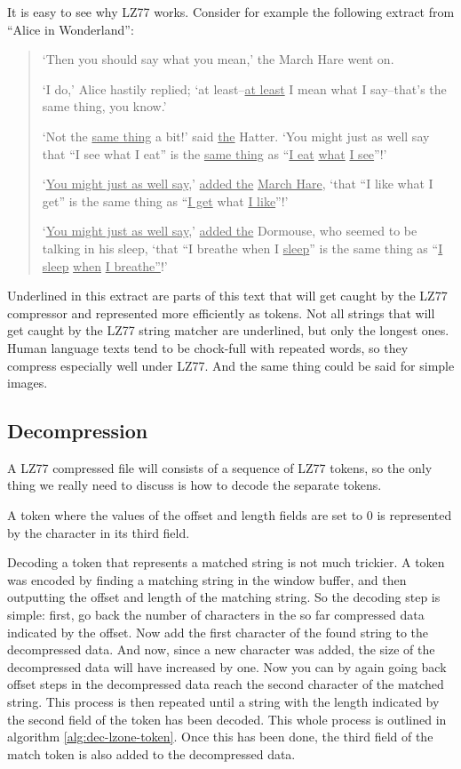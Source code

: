 It is easy to see why LZ77 works. Consider for example the following
extract from ``Alice in Wonderland'':

\begin{quote}
  `Then you should say what you mean,' the March Hare went on.

  `I do,' Alice hastily replied; `at least--\underline{at least} I
  mean what I say--that's the same thing, you know.'

  `Not the \underline{same thing} a bit!' said \underline{the} Hatter.
  `You might just as well say that ``I see what I eat'' is the
  \underline{same thing} as ``\underline{I eat} \underline{what}
  \underline{I see}''!'

  `\underline{You might just as well say},' \underline{added the}
  \underline{March Hare}, `that ``I like what I get'' is the same
  thing as ``\underline{I get} what \underline{I like}''!'

  `\underline{You might just as well say},' \underline{added the}
  Dormouse, who seemed to be talking in his sleep, `that ``I breathe
  when I \underline{sleep}'' is the same thing as ``\underline{I
    sleep} \underline{when} \underline{I breathe''}!'

\end{quote}

Underlined in this extract are parts of this text that will get caught
by the LZ77 compressor and represented more efficiently as tokens. Not
all strings that will get caught by the LZ77 string matcher are
underlined, but only the longest ones. Human language texts tend to be
chock-full with repeated words, so they compress especially well under
LZ77. And the same thing could be said for simple images.

\subsection{Decompression}

A LZ77 compressed file will consists of a sequence of LZ77 tokens, so
the only thing we really need to discuss is how to decode the separate
tokens.

A token where the values of the offset and length fields are set to
$0$ is represented by the character in its third field.

Decoding a token that represents a matched string is not much
trickier. A token was encoded by finding a matching string in the
window buffer, and then outputting the offset and length of the
matching string. So the decoding step is simple: first, go back the
number of characters in the so far compressed data indicated by the
offset. Now add the first character of the found string to the
decompressed data. And now, since a new character was added, the size
of the decompressed data will have increased by one. Now you can by
again going back offset steps in the decompressed data reach the
second character of the matched string. This process is then repeated
until a string with the length indicated by the second field of the
token has been decoded. This whole process is outlined in algorithm
\ref{alg:dec-lzone-token}. Once this has been done, the third field of
the match token is also added to the decompressed data.

